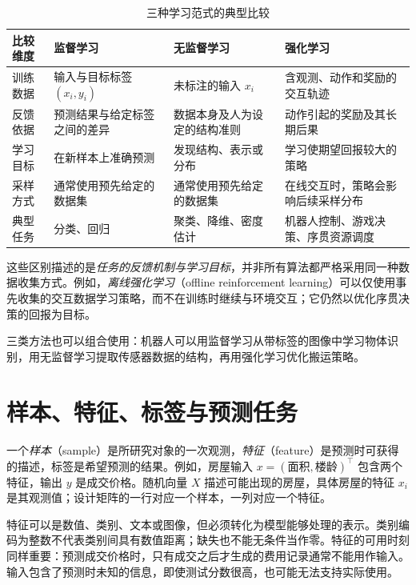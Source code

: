 \begin{table}[htbp]
  \centering
  \caption{三种学习范式的典型比较}
  \label{tab:learning-paradigms}
  \small
  \begin{tabularx}{\textwidth}{@{}L{1.7cm}YYY@{}}
    \toprule
    \textbf{比较维度} & \textbf{监督学习} & \textbf{无监督学习} & \textbf{强化学习} \\
    \midrule
    训练数据 & 输入与目标标签 $(x_i,y_i)$ & 未标注的输入 $x_i$ & 含观测、动作和奖励的交互轨迹 \\
    反馈依据 & 预测结果与给定标签之间的差异 & 数据本身及人为设定的结构准则 & 动作引起的奖励及其长期后果 \\
    学习目标 & 在新样本上准确预测 & 发现结构、表示或分布 & 学习使期望回报较大的策略 \\
    采样方式 & 通常使用预先给定的数据集 & 通常使用预先给定的数据集 & 在线交互时，策略会影响后续采样分布 \\
    典型任务 & 分类、回归 & 聚类、降维、密度估计 & 机器人控制、游戏决策、序贯资源调度 \\
    \bottomrule
  \end{tabularx}
\end{table}

这些区别描述的是\emph{任务的反馈机制与学习目标}，并非所有算法都严格采用同一种数据收集方式。例如，\emph{离线强化学习}（offline reinforcement learning）可以仅使用事先收集的交互数据学习策略，而不在训练时继续与环境交互；它仍然以优化序贯决策的回报为目标。

三类方法也可以组合使用：机器人可以用监督学习从带标签的图像中学习物体识别，用无监督学习提取传感器数据的结构，再用强化学习优化搬运策略。


\section{样本、特征、标签与预测任务}

一个\emph{样本}（sample）是所研究对象的一次观测，\emph{特征}（feature）是预测时可获得的描述，标签是希望预测的结果。例如，房屋输入 $x=(\text{面积},\text{楼龄})^\top$ 包含两个特征，输出 $y$ 是成交价格。随机向量 $X$ 描述可能出现的房屋，具体房屋的特征 $x_i$ 是其观测值；设计矩阵的一行对应一个样本，一列对应一个特征。

特征可以是数值、类别、文本或图像，但必须转化为模型能够处理的表示。类别编码为整数不代表类别间具有数值距离；缺失也不能无条件当作零。特征的可用时刻同样重要：预测成交价格时，只有成交之后才生成的费用记录通常不能用作输入。输入包含了预测时未知的信息，即使测试分数很高，也可能无法支持实际使用。

